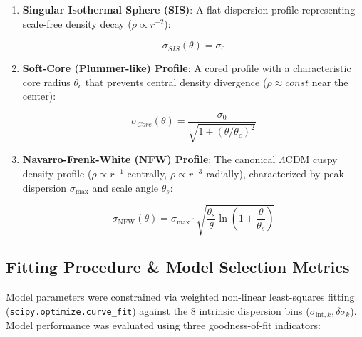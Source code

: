 \documentclass[twocolumn]{aastex631}
\begin{document}
\begin{enumerate}

	\item \textbf{Singular Isothermal Sphere (SIS)}: A flat dispersion profile representing scale-free density decay ($\rho \propto r^{-2}$):

	      \begin{equation}
		      \sigma_{SIS}(\theta) = \sigma_{0}
	      \end{equation}

	\item \textbf{Soft-Core (Plummer-like) Profile}: A cored profile with a characteristic core radius $\theta_{c}$ that prevents central density divergence ($\rho \approx const$ near the center):

	      \begin{equation}
		      \sigma_{Core}(\theta) = \frac{\sigma_{0}}{\sqrt{1+(\theta/\theta_{c})^{2}}}
	      \end{equation}

	\item \textbf{Navarro-Frenk-White (NFW) Profile}: The canonical $\Lambda \text{CDM}$ cuspy density profile ($\rho \propto r^{-1}$ centrally, $\rho \propto r^{-3}$ radially), characterized by peak dispersion $\sigma_{\text{max}}$ and scale angle $\theta_{s}$:

	      \begin{equation}
		      \sigma_{\text{NFW}}(\theta) = \sigma_{\text{max}} \cdot \sqrt{\frac{\theta_{s}}{\theta} \ln \left(1+\frac{\theta}{\theta_{s}}\right)}
	      \end{equation}

\end{enumerate}

\subsection{Fitting Procedure \& Model Selection Metrics}

Model parameters were constrained via weighted non-linear least-squares fitting (\texttt{scipy.optimize.curve_fit}) against the 8 intrinsic dispersion bins ($\sigma_{\text{int}, k}, \delta \sigma_k$). Model performance was evaluated using three goodness-of-fit indicators:
\end{document}
